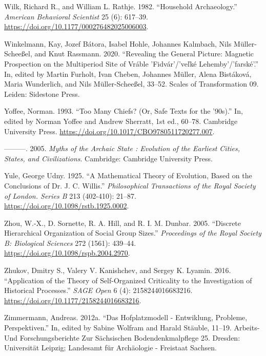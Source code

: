 \documentclass[
  12pt,
  a4paper, twoside]{book}
\newlength{\cslhangindent}
\newlength{\cslentryspacingunit} %
\newenvironment{CSLReferences}[2] %
 {%
  \setlength{\parindent}{0pt}
  \ifodd #1
  \let\oldpar\par
  \def\par{\hangindent=\cslhangindent\oldpar}
  \fi
  \setlength{\parskip}{#2\cslentryspacingunit}
 }%
 {}
\begin{document}
\begin{CSLReferences}{1}{0}
\leavevmode{}%
Wilk, Richard R., and William L. Rathje. 1982. {``Household Archaeology.''} \emph{American Behavioral Scientist} 25 (6): 617--39. \url{https://doi.org/10.1177/000276482025006003}.

\leavevmode{}%
Winkelmann, Kay, Jozef Bátora, Isabel Hohle, Johannes Kalmbach, Nils Müller-Scheeßel, and Knut Rassmann. 2020. {``Revealing the General Picture: Magnetic Prospection on the Multiperiod Site of Vráble 'Fidvár'/'ve{ľ}ké Lehemby'/'farské'.''} In, edited by Martin Furholt, Ivan Cheben, Johannes Müller, Alena Bistáková, Maria Wunderlich, and Nils Müller-Scheeßel, 33--52. Scales of Transformation 09. Leiden: Sidestone Press.

\leavevmode{}%
Yoffee, Norman. 1993. {``Too Many Chiefs? (Or, Safe Texts for the '90s).''} In, edited by Norman Yoffee and Andrew Sherratt, 1st ed., 60--78. Cambridge University Press. \url{https://doi.org/10.1017/CBO9780511720277.007}.

\leavevmode{}%
---------. 2005. \emph{Myths of the Archaic State : Evolution of the Earliest Cities, States, and Civilizations}. Cambridge: Cambridge University Press.

\leavevmode{}%
Yule, George Udny. 1925. {``A Mathematical Theory of Evolution, Based on the Conclusions of Dr. J. C. Willis.''} \emph{Philosophical Transactions of the Royal Society of London. Series B} 213 (402-410): 21--87. \url{https://doi.org/10.1098/rstb.1925.0002}.

\leavevmode{}%
Zhou, W.-X., D. Sornette, R. A. Hill, and R. I. M. Dunbar. 2005. {``Discrete Hierarchical Organization of Social Group Sizes.''} \emph{Proceedings of the Royal Society B: Biological Sciences} 272 (1561): 439--44. \url{https://doi.org/10.1098/rspb.2004.2970}.

\leavevmode{}%
Zhukov, Dmitry S., Valery V. Kanishchev, and Sergey K. Lyamin. 2016. {``Application of the {Theory} of {Self-Organized Criticality} to the {Investigation} of {Historical Processes}.''} \emph{SAGE Open} 6 (4): 2158244016683216. \url{https://doi.org/10.1177/2158244016683216}.

\leavevmode{}%
Zimmermann, Andreas. 2012a. {``Das Hofplatzmodell - Entwiklung, Probleme, Perspektiven.''} In, edited by Sabine Wolfram and Harald Stäuble, 11--19. Arbeits- Und Forschungsberichte Zur Sächsischen Bodendenkmalpflege 25. Dresden: Universität Leipzig; Landesamt für Archäologie - Freistaat Sachsen.


\end{CSLReferences}
\end{document}
